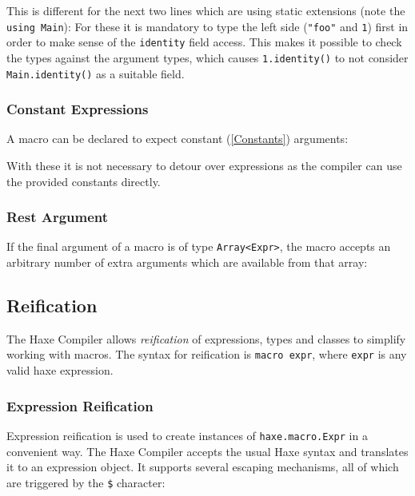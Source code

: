 \documentclass{article}
\newcommand{\type}[1]{\texttt{#1}}
\newcommand{\expr}[1]{\texttt{#1}}
\begin{document}
This is different for the next two lines which are using static extensions (note the \expr{using Main}): For these it is mandatory to type the left side (\expr{"foo"} and \expr{1}) first in order to make sense of the \expr{identity} field access. This makes it possible to check the types against the argument types, which causes \expr{1.identity()} to not consider \expr{Main.identity()} as a suitable field.

\subsubsection{Constant Expressions}

A macro can be declared to expect constant (\ref{Constants}) arguments:



With these it is not necessary to detour over expressions as the compiler can use the provided constants directly.

\subsubsection{Rest Argument}

If the final argument of a macro is of type \type{Array<Expr>}, the macro accepts an arbitrary number of extra arguments which are available from that array:






\subsection{Reification}

The Haxe Compiler allows \emph{reification} of expressions, types and classes to simplify working with macros. The syntax for reification is \expr{macro expr}, where \expr{expr} is any valid haxe expression.

\subsubsection{Expression Reification}
\label{Expression Reification}

Expression reification is used to create instances of \type{haxe.macro.Expr} in a convenient way. The Haxe Compiler accepts the usual Haxe syntax and translates it to an expression object. It supports several escaping mechanisms, all of which are triggered by the \expr{\$} character:
\end{document}
